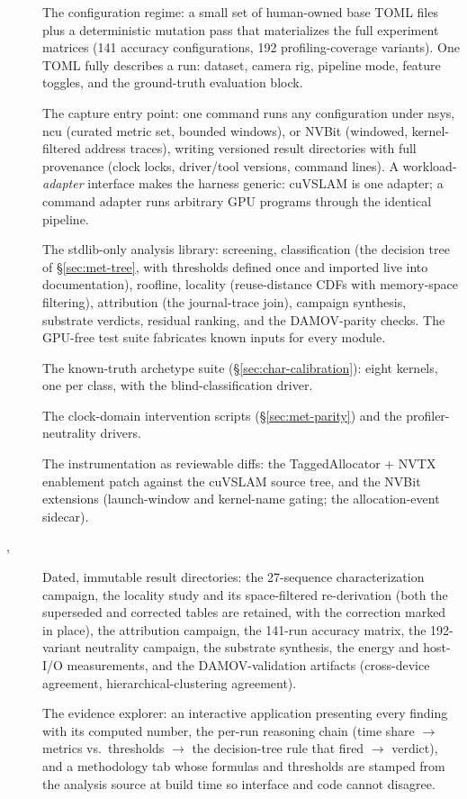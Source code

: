 \begin{description}
\item[] The configuration regime: a small set of human-owned
base TOML files plus a deterministic mutation pass that materializes the
full experiment matrices (141 accuracy configurations, 192
profiling-coverage variants). One TOML fully describes a run: dataset,
camera rig, pipeline mode, feature toggles, and the ground-truth evaluation
block.
\item[] The capture entry point: one command runs
any configuration under nsys, ncu (curated metric set, bounded windows), or
NVBit (windowed, kernel-filtered address traces), writing versioned result
directories with full provenance (clock locks, driver/tool versions,
command lines). A workload-\emph{adapter} interface makes the harness
generic: cuVSLAM is one adapter; a command adapter runs arbitrary GPU
programs through the identical pipeline.
\item[] The stdlib-only analysis library:
screening, classification (the decision tree of \S\ref{sec:met-tree}, with
thresholds defined once and imported live into documentation), roofline,
locality (reuse-distance CDFs with memory-space filtering), attribution
(the journal-trace join), campaign synthesis, substrate verdicts, residual
ranking, and the DAMOV-parity checks. The GPU-free test suite fabricates
known inputs for every module.
\item[] The known-truth archetype suite
(\S\ref{sec:char-calibration}): eight kernels, one per class, with the
blind-classification driver.
\item[] The clock-domain intervention scripts
(\S\ref{sec:met-parity}) and the profiler-neutrality drivers.
\item[] The instrumentation as reviewable diffs: the
TaggedAllocator + NVTX enablement patch against the cuVSLAM source tree,
and the NVBit  extensions (launch-window and kernel-name
gating; the allocation-event sidecar).
\item[, ] Dated, immutable result
directories: the 27-sequence characterization campaign, the locality study
and its space-filtered re-derivation (both the superseded and corrected
tables are retained, with the correction marked in place), the attribution
campaign, the 141-run accuracy matrix, the 192-variant neutrality campaign,
the substrate synthesis, the energy and host-I/O measurements, and the
DAMOV-validation artifacts (cross-device agreement, hierarchical-clustering
agreement).
\item[] The evidence explorer: an interactive application
presenting every finding with its computed number, the per-run reasoning
chain (time share $\rightarrow$ metrics vs.\ thresholds $\rightarrow$ the
decision-tree rule that fired $\rightarrow$ verdict), and a methodology tab
whose formulas and thresholds are stamped from the analysis source at build
time so interface and code cannot disagree.
\end{description}

